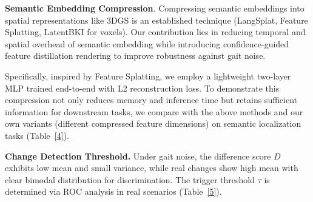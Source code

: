 \documentclass[conference]{IEEEtran}
\begin{document}
\textbf{Semantic Embedding Compression}. Compressing semantic embeddings into spatial representations like 3DGS is an established technique (LangSplat, Feature Splatting, LatentBKI for voxels). Our contribution lies in reducing temporal and spatial overhead of semantic embedding while introducing confidence-guided feature distillation rendering to improve robustness against gait noise.

Specifically, inspired by Feature Splatting, we employ a lightweight two-layer MLP trained end-to-end with L2 reconstruction loss. To demonstrate this compression not only reduces memory and inference time but retains sufficient information for downstream tasks, we compare with the above methods and our own variants (different compressed feature dimensions) on semantic localization tasks (Table~\ref{4}).

\begin{table}[h]
\centering
\caption{\small LatentBKI cannot render views; comparison is limited to semantic query success rate (SR) and memory efficiency. S/F = Slow/Fast walk. Feature distillation in MIF 32D drastically reduces VRAM and latency while preserving robustness against gait noise.}
\label{4}
\setlength{\tabcolsep}{3pt} %

\end{table}

\textbf{Change Detection Threshold.} Under gait noise, the difference score $D$ exhibits low mean and small variance, while real changes show high mean with clear bimodal distribution for discrimination. The trigger threshold $\tau$ is determined via ROC analysis in real scenarios (Table~\ref{5}).
\end{document}
